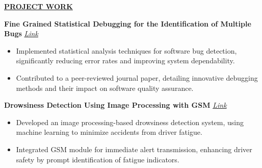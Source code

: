 \documentclass{article}
\begin{document}
\vspace{2mm} 
%
%


\noindent \textbf{\underline{PROJECT WORK}} 

\noindent \textbf{Fine Grained Statistical Debugging for the Identification of Multiple Bugs}
\textit{\href{https://www.ijert.org/fine-grained-statistical-debugging-for-the-identification-of-multiple-bugs}{Link}}
\begin{itemize}[noitemsep,nolistsep,leftmargin=*]
\item {\small Implemented statistical analysis techniques for software bug detection, significantly reducing error rates and improving system dependability.}
\item {\small Contributed to a peer-reviewed journal paper, detailing innovative debugging methods and their impact on software quality assurance.}
\end{itemize}
\vspace{1mm} 
\noindent \textbf{Drowsiness Detection Using Image Processing with GSM}
\textit{\href{https://www.irjet.net/archives/V8/i5/IRJET-V8I5773.pdf}{Link}}
\begin{itemize}[noitemsep,nolistsep,leftmargin=*]
\item {\small Developed an image processing-based drowsiness detection system, using machine learning to minimize accidents from driver fatigue.}
\item {\small Integrated GSM module for immediate alert transmission, enhancing driver safety by prompt identification of fatigue indicators.}\\
\end{itemize}


\end{document}
